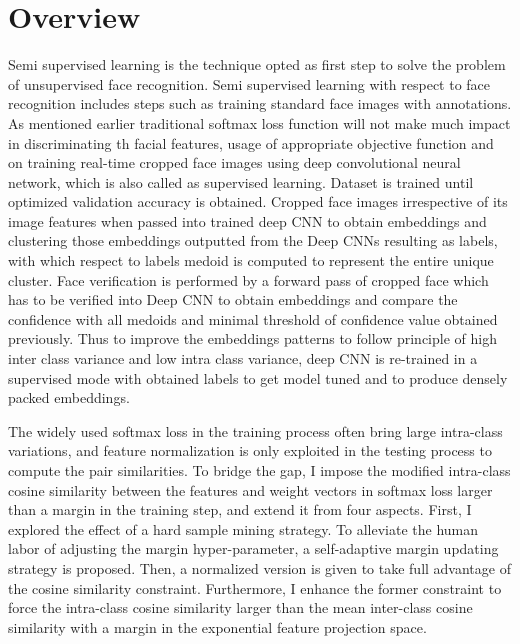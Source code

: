 \documentclass[a4paper,12pt, twoside]{NITKReport}
\begin{document}
\section{Overview}
\par Semi supervised learning is the technique opted as first step to solve the problem of unsupervised face recognition. Semi supervised learning with respect to face recognition includes steps such as training standard face images with annotations. As mentioned earlier traditional softmax loss function will not make much impact in discriminating th facial features, usage of appropriate objective function and on training real-time cropped face images using deep convolutional neural network, which is also called as supervised learning. Dataset is trained until optimized validation accuracy is obtained. Cropped face images irrespective of its image features when passed into trained deep CNN to obtain embeddings and clustering those embeddings outputted from the Deep CNNs resulting as labels, with which respect to labels medoid is computed to represent the entire unique cluster. Face verification is performed by a forward pass of cropped face which has to be verified into Deep CNN to obtain embeddings and compare the confidence with all medoids and minimal threshold of confidence value obtained previously. Thus to improve the embeddings patterns to follow principle of high inter class variance and low intra class variance, deep CNN is re-trained in a supervised mode with obtained labels to get model tuned and to produce densely packed embeddings.

\par The widely used softmax loss in the training process often bring large intra-class variations, and feature normalization is only exploited in the testing process to compute the pair similarities.  To bridge the gap, I impose the modified intra-class cosine similarity between the features and weight vectors in softmax loss larger than a margin in the training step, and extend it from four aspects. First, I explored the effect of a hard sample mining strategy. To alleviate the human labor of adjusting the margin hyper-parameter, a self-adaptive margin updating strategy is proposed. Then, a normalized version is given to take full advantage of the cosine similarity constraint. Furthermore, I enhance the former constraint to force the intra-class cosine similarity larger than the mean inter-class cosine similarity with a margin in the exponential feature projection space.
\end{document}
